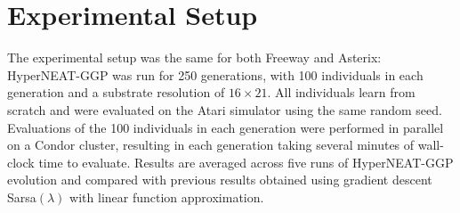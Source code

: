 \documentclass{sig-alternate}
\begin{document}



\section{Experimental Setup}
\label{sec:experiments}
The experimental setup was the same for both Freeway and Asterix: HyperNEAT-GGP was run for 250 generations, with 100 individuals in each generation and a substrate resolution of $16\times 21$. All individuals learn from scratch and were evaluated on the Atari simulator using the same random seed. Evaluations of the 100 individuals in each generation were performed in parallel on a Condor cluster, resulting in each generation taking several minutes of wall-clock time to evaluate. Results are averaged across five runs of HyperNEAT-GGP evolution and compared with previous results obtained using gradient descent Sarsa$(\lambda)$ with linear function approximation\cite{naddaf10}. 
\end{document}
